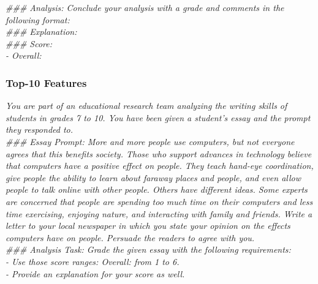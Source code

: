 \textit{
\#\#\# Analysis: Conclude your analysis with a grade and comments in the following format:  \\
\#\#\# Explanation:  \\
\#\#\# Score: \\
- Overall:
}


\subsubsection{Top-10 Features}
\textit{
You are part of an educational research team analyzing the writing skills of students in grades 7 to 10. You have been given a student's essay and the prompt they responded to.  \\
\#\#\# Essay Prompt: More and more people use computers, but not everyone agrees that this benefits society. Those who support advances in technology believe that computers have a positive effect on people. They teach hand-eye coordination, give people the ability to learn about faraway places and people, and even allow people to talk online with other people. Others have different ideas. Some experts are concerned that people are spending too much time on their computers and less time exercising, enjoying nature, and interacting with family and friends. Write a letter to your local newspaper in which you state your opinion on the effects computers have on people. Persuade the readers to agree with you.  \\
}
\textit{
\#\#\# Analysis Task: Grade the given essay with the following requirements:  \\
- Use those score ranges: Overall: from 1 to 6.  \\
- Provide an explanation for your score as well.  \\
}
